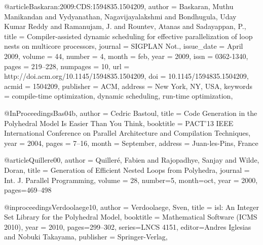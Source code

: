 @article{Baskaran:2009:CDS:1594835.1504209,
 author = {Baskaran, Muthu Manikandan and Vydyanathan, Nagavijayalakshmi and Bondhugula, Uday Kumar Reddy and Ramanujam, J. and Rountev, Atanas and Sadayappan, P.},
 title = {Compiler-assisted dynamic scheduling for effective parallelization of loop nests on multicore processors},
 journal = {SIGPLAN Not.},
 issue_date = {April 2009},
 volume = {44},
 number = {4},
 month = feb,
 year = {2009},
 issn = {0362-1340},
 pages = {219--228},
 numpages = {10},
 url = {http://doi.acm.org/10.1145/1594835.1504209},
 doi = {10.1145/1594835.1504209},
 acmid = {1504209},
 publisher = {ACM},
 address = {New York, NY, USA},
 keywords = {compile-time optimization, dynamic scheduling, run-time optimization},
}

@InProceedings{Bas04b,
 author = {Cedric Bastoul},
 title = {Code Generation in the Polyhedral Model Is Easier Than You Think},
 booktitle = {PACT'13 IEEE International Conference on Parallel Architecture
              and Compilation Techniques},
 year =	2004,
 pages = {7--16},
 month = {September},
 address = {Juan-les-Pins, France}
}

@article{Quillere00,
 author = {Quiller\'{e}, Fabien and Rajopadhye, Sanjay and Wilde, Doran},
 title = {Generation of Efficient Nested Loops from Polyhedra},
 journal = {Int. J. Parallel Programming},
 volume = 28,
 number=5,
 month=oct,
 year = 2000,
pages={469--498}
}

@inproceedings{Verdoolaege10,
   author = {Verdoolaege, Sven},
   title = {isl: {A}n Integer Set Library for the Polyhedral Model},
   booktitle = {Mathematical Software (ICMS 2010)},
   year = {2010},
   pages={299--302},
   series={LNCS 4151},
   editor={Andres Iglesias and Nobuki Takayama},
   publisher = {Springer-Verlag},
}
